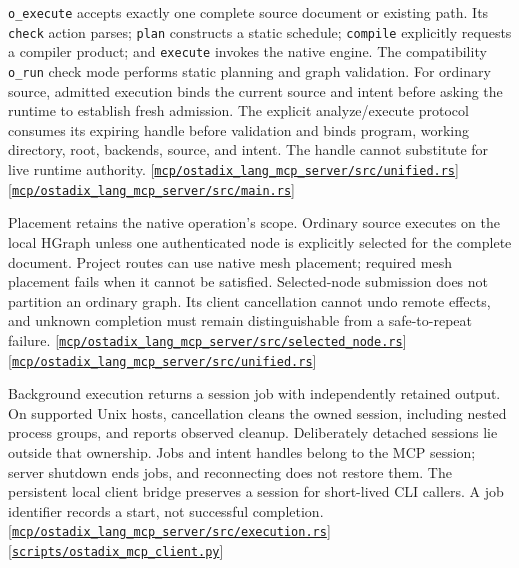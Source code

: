 \documentclass[11pt,oneside]{article}
\newcommand{\src}[1]{\textcolor{OSlate}{\scriptsize[\href{https://github.com/lostadi/OSTADIX/blob/c0b02c326b2329a95ba52447c7180bc93957cd57/#1}{\nolinkurl{#1}}]}\allowbreak}
\begin{document}
\texttt{o\_execute} accepts exactly one complete source document or existing
path. Its \texttt{check} action parses; \texttt{plan} constructs a static
schedule; \texttt{compile} explicitly requests a compiler product; and
\texttt{execute} invokes the native engine. The compatibility
\texttt{o\_run} check mode performs static planning and graph validation.
For ordinary source, admitted execution binds the current source and intent
before asking the runtime to establish fresh admission. The explicit
analyze/execute protocol consumes its expiring handle before validation and
binds program, working directory, root, backends, source, and intent. The
handle cannot substitute for live runtime authority.
\src{mcp/ostadix_lang_mcp_server/src/unified.rs}
\src{mcp/ostadix_lang_mcp_server/src/main.rs}

Placement retains the native operation's scope. Ordinary source executes on
the local HGraph unless one authenticated node is explicitly selected for the
complete document. Project routes can use native mesh placement; required
mesh placement fails when it cannot be satisfied. Selected-node submission
does not partition an ordinary graph. Its client cancellation cannot undo
remote effects, and unknown completion must remain distinguishable from a
safe-to-repeat failure.
\src{mcp/ostadix_lang_mcp_server/src/selected_node.rs}
\src{mcp/ostadix_lang_mcp_server/src/unified.rs}

Background execution returns a session job with independently retained output.
On supported Unix hosts, cancellation cleans the owned session, including
nested process groups, and reports observed cleanup. Deliberately detached
sessions lie outside that ownership. Jobs and intent handles belong to the
MCP session; server shutdown ends jobs, and reconnecting does not restore
them. The persistent local client bridge preserves a session for short-lived
CLI callers. A job identifier records a start, not successful completion.
\src{mcp/ostadix_lang_mcp_server/src/execution.rs}
\src{scripts/ostadix_mcp_client.py}
\end{document}
